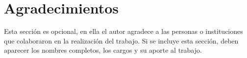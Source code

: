 \chapter*{Agradecimientos}

Esta sección es opcional, en ella el autor agradece a las personas o instituciones que colaboraron en la realización del trabajo. Si se incluye esta sección, deben aparecer los nombres completos, los cargos y su aporte al trabajo.
  
